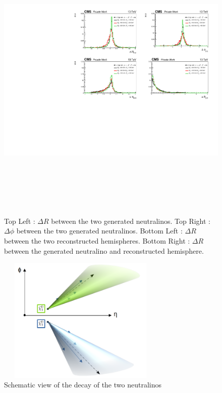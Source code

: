 \documentclass{cernatlasnote}
\begin{document}
\begin{figure}[ht]
\centering
\includegraphics[height=14cm, width=17cm, trim= 2cm 0cm 0cm 0.cm,clip]{images/Topology/dPhi_GenGen.pdf}
\caption{\label{fig:dRNEUNEU} Top Left : $\Delta R$ between the two generated neutralinos. Top Right :  $\Delta \phi$ between the two generated neutralinos. Bottom Left : $\Delta R$ between the two reconstructed hemispheres. Bottom Right : $\Delta R$ between the generated neutralino and reconstructed hemisphere.  }
\end{figure}

\begin{figure}[ht]
\centering
\includegraphics[height=6cm, width=8cm, trim= 0cm 0cm 0cm 0.cm,clip]{images/Topology/topo.png}
\caption{\label{fig:Geometry} Schematic view of the decay of the two neutralinos}
\end{figure}
\FloatBarrier
\end{document}
